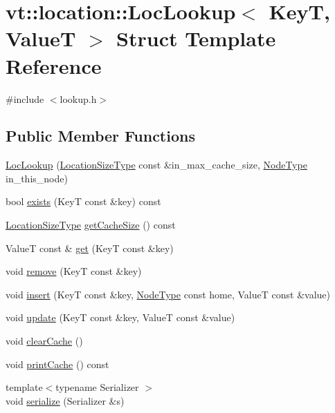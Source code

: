\hypertarget{structvt_1_1location_1_1_loc_lookup}{}\section{vt\+:\+:location\+:\+:Loc\+Lookup$<$ KeyT, ValueT $>$ Struct Template Reference}
\label{structvt_1_1location_1_1_loc_lookup}


{\ttfamily \#include $<$lookup.\+h$>$}

\subsection*{Public Member Functions}
\begin{DoxyCompactItemize}
\item 
\hyperlink{structvt_1_1location_1_1_loc_lookup_a27e5f79af811503f9c0652b9f1be35b8}{Loc\+Lookup} (\hyperlink{namespacevt_1_1location_ab1c4c5849012a23eee2fbd1fce6159d7}{Location\+Size\+Type} const \&in\+\_\+max\+\_\+cache\+\_\+size, \hyperlink{namespacevt_a866da9d0efc19c0a1ce79e9e492f47e2}{Node\+Type} in\+\_\+this\+\_\+node)
\item 
bool \hyperlink{structvt_1_1location_1_1_loc_lookup_ad1c4809e9687c975335fee019cc3e39b}{exists} (KeyT const \&key) const
\item 
\hyperlink{namespacevt_1_1location_ab1c4c5849012a23eee2fbd1fce6159d7}{Location\+Size\+Type} \hyperlink{structvt_1_1location_1_1_loc_lookup_a95081b04f2cd212457ec56c579ba988b}{get\+Cache\+Size} () const
\item 
ValueT const  \& \hyperlink{structvt_1_1location_1_1_loc_lookup_a3be47c30312499b386c2d459b4b81c9f}{get} (KeyT const \&key)
\item 
void \hyperlink{structvt_1_1location_1_1_loc_lookup_a6c82de648f51e3242bd7430d185041fe}{remove} (KeyT const \&key)
\item 
void \hyperlink{structvt_1_1location_1_1_loc_lookup_a63ff201b384e4f65c02b3a99b8ba543e}{insert} (KeyT const \&key, \hyperlink{namespacevt_a866da9d0efc19c0a1ce79e9e492f47e2}{Node\+Type} const home, ValueT const \&value)
\item 
void \hyperlink{structvt_1_1location_1_1_loc_lookup_a95e6e8096c0d9c5a76727ebbf441995a}{update} (KeyT const \&key, ValueT const \&value)
\item 
void \hyperlink{structvt_1_1location_1_1_loc_lookup_aae2c3e418b59b36c0a53da17fe7fb3b8}{clear\+Cache} ()
\item 
void \hyperlink{structvt_1_1location_1_1_loc_lookup_a03bf48e7c5af3720c13e00ead13c83a0}{print\+Cache} () const
\item 
{\footnotesize template$<$typename Serializer $>$ }\\void \hyperlink{structvt_1_1location_1_1_loc_lookup_ae9630052fad15f278030f1dbf8e2a545}{serialize} (Serializer \&s)
\end{DoxyCompactItemize}
